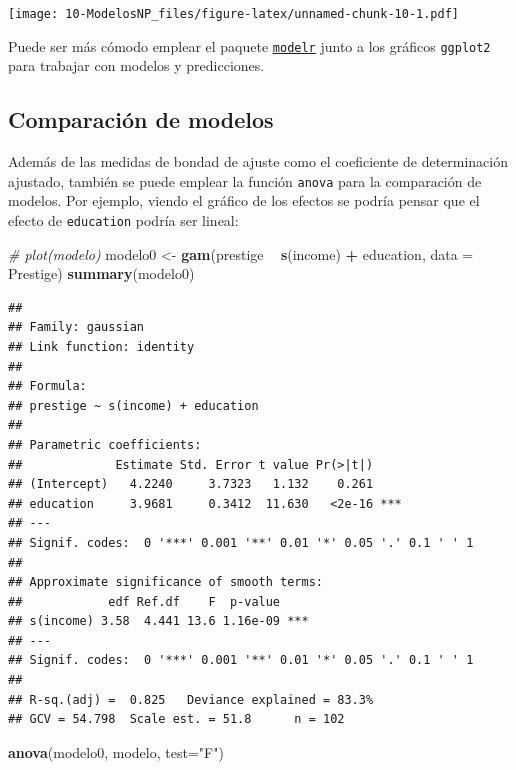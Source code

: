\documentclass[]{book}
\newenvironment{Shaded}{\begin{snugshade}}{\end{snugshade}}
\newcommand{\KeywordTok}[1]{\textcolor[rgb]{0.13,0.29,0.53}{\textbf{#1}}}
\newcommand{\DataTypeTok}[1]{\textcolor[rgb]{0.13,0.29,0.53}{#1}}
\newcommand{\StringTok}[1]{\textcolor[rgb]{0.31,0.60,0.02}{#1}}
\newcommand{\CommentTok}[1]{\textcolor[rgb]{0.56,0.35,0.01}{\textit{#1}}}
\newcommand{\OperatorTok}[1]{\textcolor[rgb]{0.81,0.36,0.00}{\textbf{#1}}}
\newcommand{\NormalTok}[1]{#1}
\begin{document}
\texttt{[image: 10-ModelosNP\_files/figure-latex/unnamed-chunk-10-1.pdf]}

Puede ser más cómodo emplear el paquete
\href{https://github.com/hadley/modelr}{\texttt{modelr}} junto a los
gráficos \texttt{ggplot2} para trabajar con modelos y predicciones.

\subsection{Comparación de modelos}\label{comparacion-de-modelos}

Además de las medidas de bondad de ajuste como el coeficiente de
determinación ajustado, también se puede emplear la función
\texttt{anova} para la comparación de modelos. Por ejemplo, viendo el
gráfico de los efectos se podría pensar que el efecto de
\texttt{education} podría ser lineal:

\begin{Shaded}
\begin{Highlighting}[]
\CommentTok{# plot(modelo)}
\NormalTok{modelo0 <-}\StringTok{ }\KeywordTok{gam}\NormalTok{(prestige }\OperatorTok{~}\StringTok{ }\KeywordTok{s}\NormalTok{(income) }\OperatorTok{+}\StringTok{ }\NormalTok{education, }\DataTypeTok{data =}\NormalTok{ Prestige)}
\KeywordTok{summary}\NormalTok{(modelo0)}
\end{Highlighting}
\end{Shaded}

\begin{verbatim}
## 
## Family: gaussian 
## Link function: identity 
## 
## Formula:
## prestige ~ s(income) + education
## 
## Parametric coefficients:
##             Estimate Std. Error t value Pr(>|t|)    
## (Intercept)   4.2240     3.7323   1.132    0.261    
## education     3.9681     0.3412  11.630   <2e-16 ***
## ---
## Signif. codes:  0 '***' 0.001 '**' 0.01 '*' 0.05 '.' 0.1 ' ' 1
## 
## Approximate significance of smooth terms:
##            edf Ref.df    F  p-value    
## s(income) 3.58  4.441 13.6 1.16e-09 ***
## ---
## Signif. codes:  0 '***' 0.001 '**' 0.01 '*' 0.05 '.' 0.1 ' ' 1
## 
## R-sq.(adj) =  0.825   Deviance explained = 83.3%
## GCV = 54.798  Scale est. = 51.8      n = 102
\end{verbatim}

\begin{Shaded}
\begin{Highlighting}[]
\KeywordTok{anova}\NormalTok{(modelo0, modelo, }\DataTypeTok{test=}\StringTok{"F"}\NormalTok{)}
\end{Highlighting}
\end{Shaded}
\end{document}
